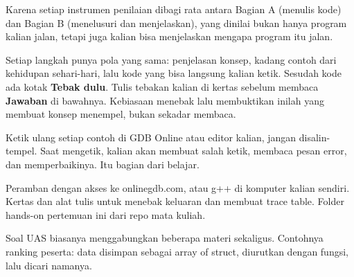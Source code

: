 \documentclass[a4paper]{article}
\begin{document}
\par\vspace{4pt}\par\vspace{6pt}
Karena setiap instrumen penilaian dibagi rata antara Bagian A (menulis kode) dan Bagian B (menelusuri dan menjelaskan), yang dinilai bukan hanya program kalian jalan, tetapi juga kalian bisa menjelaskan mengapa program itu jalan.

Setiap langkah punya pola yang sama: penjelasan konsep, kadang contoh dari kehidupan sehari-hari, lalu kode yang bisa langsung kalian ketik. Sesudah kode ada kotak \textbf{Tebak dulu}. Tulis tebakan kalian di kertas sebelum membaca \textbf{Jawaban} di bawahnya. Kebiasaan menebak lalu membuktikan inilah yang membuat konsep menempel, bukan sekadar membaca.

\begin{Penting}
Ketik ulang setiap contoh di GDB Online atau editor kalian, jangan disalin-tempel. Saat mengetik, kalian akan membuat salah ketik, membaca pesan error, dan memperbaikinya. Itu bagian dari belajar.
\end{Penting}
Peramban dengan akses ke onlinegdb.com, atau g++ di komputer kalian sendiri. Kertas dan alat tulis untuk menebak keluaran dan membuat trace table. Folder hands-on pertemuan ini dari repo mata kuliah.

Soal UAS biasanya menggabungkan beberapa materi sekaligus. Contohnya ranking peserta: data disimpan sebagai array of struct, diurutkan dengan fungsi, lalu dicari namanya.
\end{document}
